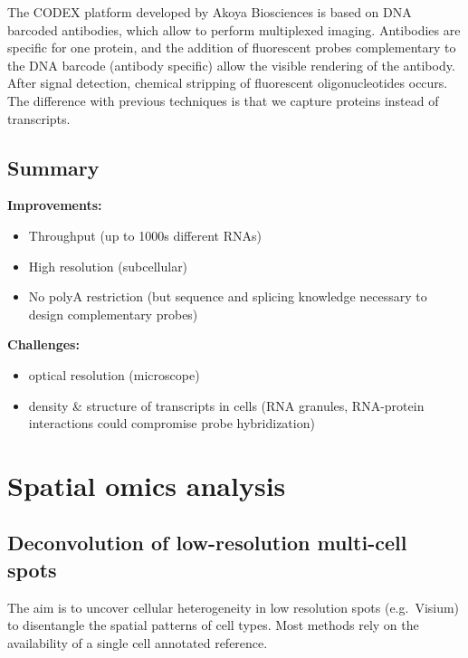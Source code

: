 The CODEX platform developed by Akoya Biosciences is based on DNA
barcoded antibodies, which allow to perform multiplexed imaging.
Antibodies are specific for one protein, and the addition of fluorescent
probes complementary to the DNA barcode (antibody specific) allow the
visible rendering of the antibody. After signal detection, chemical
stripping of fluorescent oligonucleotides occurs. The difference with
previous techniques is that we capture proteins instead of transcripts.

\hypertarget{summary}{%
\subsection{Summary}\label{summary}}

\textbf{Improvements:}

\begin{itemize}
\tightlist
\item
  Throughput (up to 1000s different RNAs)
\item
  High resolution (subcellular)
\item
  No polyA restriction (but sequence and splicing knowledge necessary to
  design complementary probes)
\end{itemize}

\textbf{Challenges:}

\begin{itemize}
\tightlist
\item
  optical resolution (microscope)
\item
  density \& structure of transcripts in cells (RNA granules,
  RNA-protein interactions could compromise probe hybridization)
\end{itemize}

\hypertarget{spatial-omics-analysis}{%
\section{Spatial omics analysis}\label{spatial-omics-analysis}}

\hypertarget{deconvolution-of-low-resolution-multi-cell-spots}{%
\subsection{Deconvolution of low-resolution multi-cell
spots}\label{deconvolution-of-low-resolution-multi-cell-spots}}

The aim is to uncover cellular heterogeneity in low resolution spots
(e.g.~Visium) to disentangle the spatial patterns of cell types. Most
methods rely on the availability of a single cell annotated reference.

